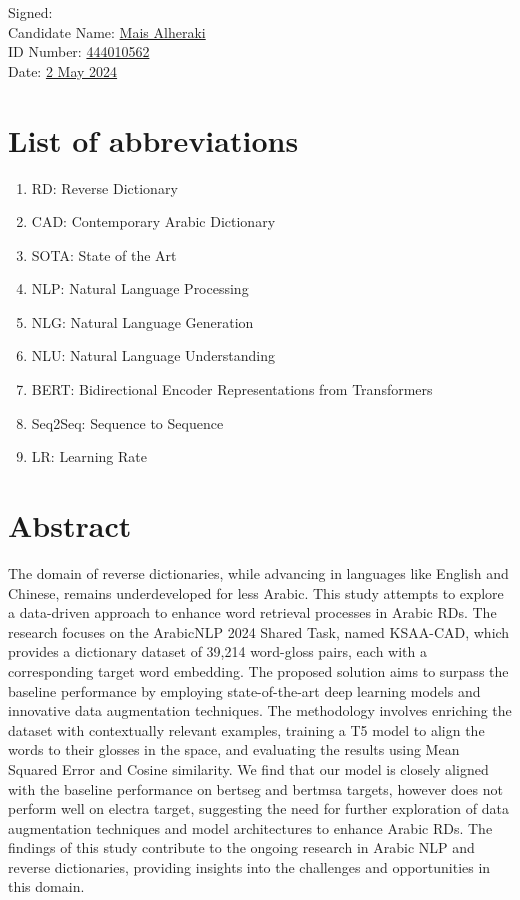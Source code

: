 \documentclass[12pt]{article}
\begin{document}
\noindent
Signed:\\
Candidate Name: \underline{Mais Alheraki}\\
ID Number: \underline{444010562}\\
Date: \underline{2 May 2024}



\newpage

\thispagestyle{empty}
\listoffigures
\newpage
\thispagestyle{empty}
\listoftables
\newpage

\section*{List of abbreviations}
\begin{enumerate}
    \item[] RD: Reverse Dictionary
    \item[] CAD: Contemporary Arabic Dictionary
    \item[] SOTA: State of the Art
    \item[] NLP: Natural Language Processing
    \item[] NLG: Natural Language Generation
    \item[] NLU: Natural Language Understanding
    \item[] BERT: Bidirectional Encoder Representations from Transformers
    \item[] Seq2Seq: Sequence to Sequence
    \item[] LR: Learning Rate
\end{enumerate}
\newpage

\section*{Abstract}

The domain of reverse dictionaries, while advancing in languages like English and Chinese, remains underdeveloped for less Arabic. This study attempts to explore a data-driven approach to enhance word retrieval processes in Arabic RDs. The research focuses on the ArabicNLP 2024 Shared Task, named KSAA-CAD, which provides a dictionary dataset of 39,214 word-gloss pairs, each with a corresponding target word embedding. The proposed solution aims to surpass the baseline performance by employing state-of-the-art deep learning models and innovative data augmentation techniques. The methodology involves enriching the dataset with contextually relevant examples, training a T5 model to align the words to their glosses in the space, and evaluating the results using Mean Squared Error and Cosine similarity. We find that our model is closely aligned with the baseline performance on bertseg and bertmsa targets, however does not perform well on electra target, suggesting the need for further exploration of data augmentation techniques and model architectures to enhance Arabic RDs. The findings of this study contribute to the ongoing research in Arabic NLP and reverse dictionaries, providing insights into the challenges and opportunities in this domain.
\end{document}
